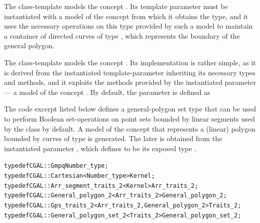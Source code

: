The class-template 
models the concept . Its template parameter must be
instantiated with a model of the concept
 from which it obtains the 
 type, and it uses the necessary 
operations on this type provided by such a model to maintain a container 
of directed curves of type , which represents the 
boundary of the general polygon.

The class-template 
models the concept . Its implementation is 
rather simple, as it is derived from the instantiated template-parameter 
 inheriting its necessary types and methods, 
and it exploits the methods provided by the instantiated parameter 
 --- a model of the concept .
By default, the  parameter is defined as

The code excerpt listed below defines a general-polygon set type that
can be used to perform Boolean set-operations on point sets bounded by
linear segments used by the  class by default. A
model of the  concept that represents a
(linear) polygon bounded by curves of type  is
generated. The later is obtained from the instantiated parameter
, which defines  to be
its exposed type .
\begin{alltt}
typedef CGAL::Gmpq                              	   Number_type;
typedef CGAL::Cartesian<Number_type>            	   Kernel;
typedef CGAL::Arr_segment_traits_2<Kernel>      	   Arr_traits_2;
typedef CGAL::General_polygon_2<Arr_traits_2>   	   General_polygon_2;
typedef CGAL::Gps_traits_2<Arr_traits_2,General_polygon_2> Traits_2;
typedef CGAL::General_polygon_set_2<Traits_2>              General_polygon_set_2;
\end{alltt}

